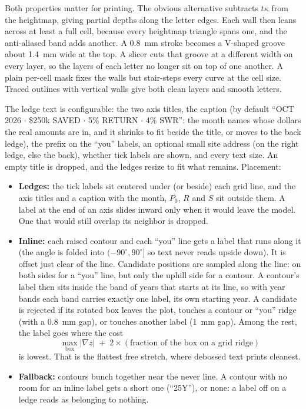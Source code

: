 \documentclass[11pt,letterpaper]{article}
\begin{document}
Both properties matter for printing. The obvious alternative subtracts $t\kappa$ from the heightmap, giving partial depths along the letter edges. Each wall then leans across at least a full cell, because every heightmap triangle spans one, and the anti-aliased band adds another. A 0.8~mm stroke becomes a V-shaped groove about 1.4~mm wide at the top. A slicer cuts that groove at a different width on every layer, so the layers of each letter no longer sit on top of one another. A plain per-cell mask fixes the walls but stair-steps every curve at the cell size. Traced outlines with vertical walls give both clean layers and smooth letters.

The ledge text is configurable: the two axis titles, the caption (by default ``OCT 2026 $\cdot$ \$250k SAVED $\cdot$ 5\% RETURN $\cdot$ 4\% SWR'': the month names whose dollars the real amounts are in, and it shrinks to fit beside the title, or moves to the back ledge), the prefix on the ``you'' labels, an optional small site address (on the right ledge, else the back), whether tick labels are shown, and every text size. An empty title is dropped, and the ledges resize to fit what remains. Placement:
\begin{itemize}
\setlength\itemsep{1pt}
\item \textbf{Ledges:} the tick labels sit centered under (or beside) each grid line, and the axis titles and a caption with the month, $P_0$, $R$ and $S$ sit outside them. A label at the end of an axis slides inward only when it would leave the model. One that would still overlap its neighbor is dropped.
\item \textbf{Inline:} each raised contour and each ``you'' line gets a label that runs along it (the angle is folded into $(-90^\circ, 90^\circ]$ so text never reads upside down). It is offset just clear of the line. Candidate positions are sampled along the line: on both sides for a ``you'' line, but only the uphill side for a contour. A contour's label then sits inside the band of years that starts at its line, so with year bands each band carries exactly one label, its own starting year. A candidate is rejected if its rotated box leaves the plot, touches a contour or ``you'' ridge (with a 0.8~mm gap), or touches another label (1~mm gap). Among the rest, the label goes where the cost
\[ \max_{\text{box}} |\nabla z| \;+\; 2 \times (\text{fraction of the box on a grid ridge}) \]
is lowest. That is the flattest free stretch, where debossed text prints cleanest.
\item \textbf{Fallback:} contours bunch together near the never line. A contour with no room for an inline label gets a short one (``25Y''), or none: a label off on a ledge reads as belonging to nothing.
\end{itemize}
\end{document}
